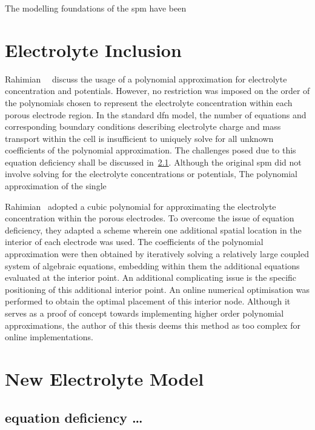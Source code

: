 The modelling foundations of the \gls{spm} have been






\section{Electrolyte Inclusion}\label{sec:electrolyteinclusion}

Rahimian~\etal{}~\cite{KhaleghiRahimian2013}  discuss  the  usage  of  a
polynomial approximation for electrolyte  concentration and potentials. However,
no restriction was  imposed on the order of the  polynomials chosen to represent
the  electrolyte  concentration within  each  porous  electrode region.  In  the
standard \gls{dfn}  model, the  number of  equations and  corresponding boundary
conditions describing electrolyte  charge and mass transport within  the cell is
insufficient to  uniquely solve for  all unknown coefficients of  the polynomial
approximation.  The  challenges posed  due  to  this equation  deficiency  shall
be  discussed  in~\cref{temp:eqndeficiency}.
Although  the original  \gls{spm} did  not involve  solving for  the electrolyte
concentrations or potentials, The polynomial approximation of the single


Rahimian~\etal{} adopted  a cubic  polynomial for approximating  the electrolyte
concentration within  the porous electrodes.  To overcome the issue  of equation
deficiency, they adapted a scheme wherein one additional spatial location in the
interior  of  each  electrode  was  used. The  coefficients  of  the  polynomial
approximation  were then  obtained  by iteratively  solving  a relatively  large
coupled  system of  algebraic equations,  embedding within  them the  additional
equations evaluated at  the interior point. An additional  complicating issue is
the specific positioning of this  additional interior point. An online numerical
optimisation  was performed  to obtain  the optimal  placement of  this interior
node. Although it serves as a proof of concept towards implementing higher order
polynomial approximations,  the author of this  thesis deems this method  as too
complex for online implementations.

\section{New Electrolyte Model}\label{sec:newelectrolytemodel}



\subsection{equation deficiency \dots}\label{temp:eqndeficiency}

